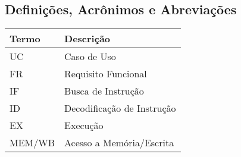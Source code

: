   \subsection{Definições, Acrônimos e Abreviações}
  \FloatBarrier
    \begin{table}[H] 
      \begin{center}
        \begin{tabular}[pos]{|m{2cm} | m{8cm}|} 
          \hline \cellcolor[gray]{0.9}\textbf{Termo} & \cellcolor[gray]{0.9}\textbf{Descrição} \\ \hline
          UC & Caso de Uso  \\ \hline
          FR & Requisito Funcional \\ \hline
          IF & Busca de Instrução \\ \hline
          ID & Decodificação de Instrução \\ \hline 
          EX & Execução \\ \hline 
          MEM/WB & Acesso a Memória/Escrita \\ \hline
        \end{tabular}
      \end{center}
    \label{tab:definicoes}
    \end{table}